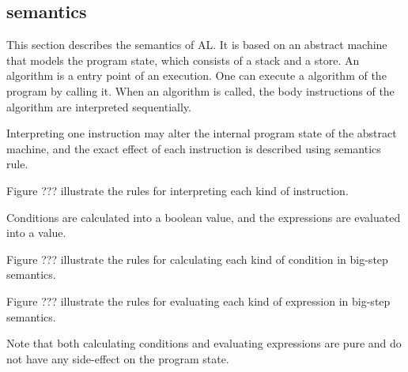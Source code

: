 \subsection{semantics}

This section describes the semantics of AL. It is based on an abstract machine
that models the program state, which consists of a stack and a store. An
algorithm is a entry point of an execution. One can execute a algorithm of the
program by calling it.  When an algorithm is called, the body instructions of
the algorithm are interpreted sequentially.

Interpreting one instruction may alter the internal program state of the
abstract machine, and the exact effect of each instruction is described using
semantics rule.

Figure ???  illustrate the rules for interpreting each
kind of instruction.

Conditions are calculated into a
boolean value, and the expressions are evaluated into a value.

Figure ??? illustrate the rules for calculating each kind of condition in
big-step semantics. 

Figure ??? illustrate the rules for evaluating each kind of expression in big-step
semantics. 

Note that both calculating conditions and evaluating expressions are pure and
do not have any side-effect on the program state.



